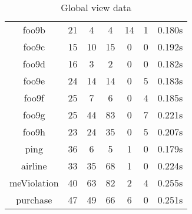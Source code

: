\begin{table}[h]
\begin{tabular}{|c|c|c|c|c|c|c|}
foo9b & 21 & 4 & 4 & 14 & 1 & 0.180s \\ 
foo9c & 15 & 10 & 15 & 0 & 0 & 0.192s \\ 
foo9d & 16 & 3 & 2 & 0 & 0 & 0.182s \\ 
foo9e & 24 & 14 & 14 & 0 & 5 & 0.183s \\ 
foo9f & 25 & 7 & 6 & 0 & 4 & 0.185s \\ 
foo9g & 25 & 44 & 83 & 0 & 7 & 0.221s \\ 
foo9h & 23 & 24 & 35 & 0 & 5 & 0.207s \\ 
ping & 36 & 6 & 5 & 1 & 0 & 0.179s \\ 
airline & 33 & 35 & 68 & 1 & 0 & 0.224s \\ 
meViolation & 40 & 63 & 82 & 2 & 4 & 0.255s \\ 
purchase & 47 & 49 & 66 & 6 & 0 & 0.251s \\ 
\hline
\end{tabular}
\caption{Global view data}
\label{tab:gvbench}
\end{table}